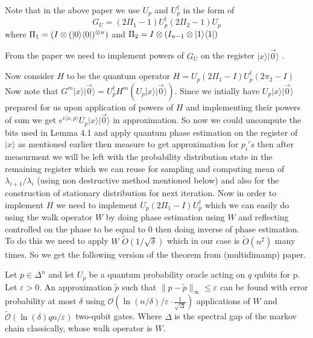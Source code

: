 \begin{flushleft}
\begin{flushleft}
\begin{theorem}
\end{theorem}
Note that in the above paper we use $U_p$ and $U_p^{\dagger}$ in the form of $$
G_U= (2\Pi_1 -1)U_p^{\dagger}(2\Pi_2-1)U_p$$
where $\Pi_1=(I\otimes(|0\rangle\langle0|)^{\otimes n})$ and $\Pi_2= I\otimes( I_{n-1} \otimes |1\rangle \langle1|)$

	\end{flushleft}
	
\begin{flushleft}
	From the paper we need to implement powers of $G_U$ on the register $|x\rangle |\vec{0}\rangle$ .
\end{flushleft}
Now consider $H$ to be the quantum operator $H=U_p(2\Pi_1-I) U_p^{\dagger}(2\pi_2 -I)$
Now note that $G^m |x\rangle |\vec{0}\rangle = U_p^{\dagger} H^m (U_p |x\rangle |\vec{0}\rangle )$. Since we intially have $U_p|x\rangle |\vec{0}\rangle$ prepared for us upon application of powers of $H$ and implementing their powers of sum we get $e^{i \langle x,p \rangle} U_p |x\rangle |\vec{0}\rangle $ in approximation. So now we could uncompute the bits used in Lemma 4.1 and apply quantum phase estimation on the register of $|x\rangle$ as mentioned earlier then measure to get approximation for $p_i's$ then after measurment we will be left with  the probability distribution state in the remaining register which we can reuse for sampling and computing mean of $\lambda_{i+1}/ \lambda_i$ (using non destructive method mentioned below) and also for the construction of stationary distribution for next iteration.
Now in order to implement $H$ we need to implement $U_p(2\Pi_1-I) U_p^{\dagger}$ which we can easily do using the walk operator $W$ by doing phase estimation using $W$ and reflecting controlled on the phase to be equal to $0$ then doing inverse of phase estimation. To do this we need to apply  $W$ $\tilde{O}(1/\sqrt{\delta})$ which in our case is $\tilde{O}(n^2)$ many times. So we get the following version of the theorem from (multidimamp) paper.
\begin{theorem}
	 Let $p \in \Delta^n$ and let $U_p$ be a quantum probability oracle acting on $q$ qubits for p. Let $\varepsilon>0$. An approximation $\tilde{p}$ such that $\|p-\tilde{p}\|_{\infty} \leq \varepsilon$ can be found with error probability at most $\delta$ using $\mathcal{O}(\ln (n / \delta) / \varepsilon \cdot \frac{1}{\sqrt{\Delta}})$ applications of $W$ and $\widetilde{\mathcal{O}}(\ln (\delta) q n / \varepsilon)$ two-qubit gates. Where $\Delta$ is the spectral gap of the markov chain classically, whose walk operator is $W$.
\end{theorem}
\end{flushleft} 
